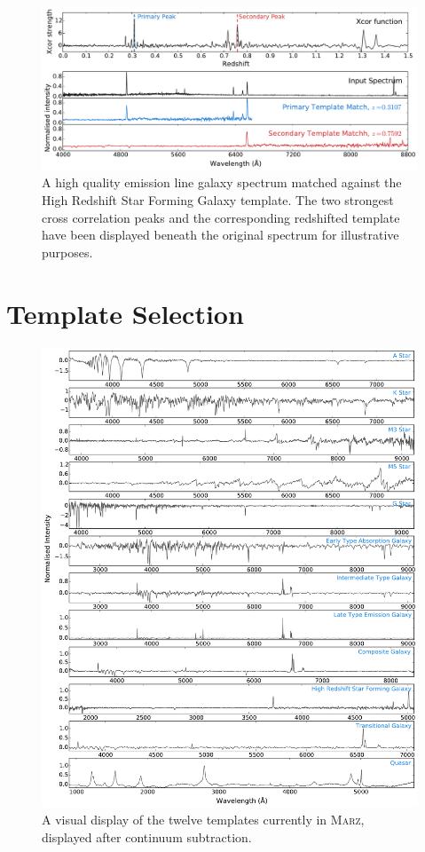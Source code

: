\documentclass[iop]{emulateapj}
\newcommand{\marz}{\textsc{Marz}}
\begin{document}
\begin{figure}[t]
\centering
\includegraphics[width=\textwidth]{xcors.pdf}
\caption{A high quality emission line galaxy spectrum matched against the High Redshift Star Forming Galaxy template. The two strongest cross correlation peaks and the corresponding redshifted template have been displayed beneath the original spectrum for illustrative purposes.}
\label{fig:xcors}
\end{figure}








\section{Template Selection}



\begin{figure}[h]
\centering
\includegraphics[width=\textwidth]{templates.pdf}
\caption{A visual display of the twelve templates currently in \marz{}, displayed after continuum subtraction.}
\label{fig:templates}
\end{figure}
\end{document}
